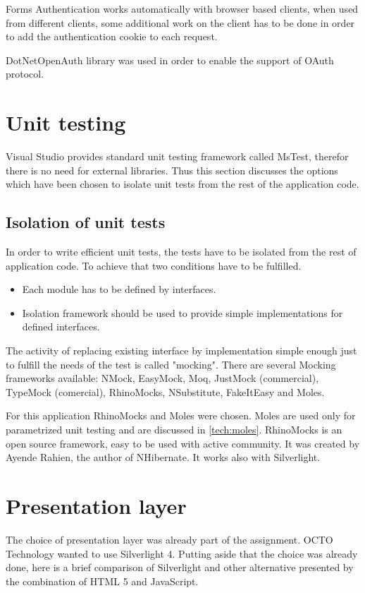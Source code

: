 Forms Authentication works automatically with browser based clients, when used from different clients, some additional work on the client has to be done in order to add the authentication cookie to each request.
 
DotNetOpenAuth library was used in order to enable the support of OAuth protocol.

\section{Unit testing}
\label{tech:unit}
Visual Studio provides standard unit testing framework called MsTest, therefor there is no need for external libraries. Thus this section discusses the options which have been chosen to isolate unit tests from the rest of the application code.

\subsection{Isolation of unit tests}
\label{tech:isolation}
In order to write efficient unit tests, the tests have to be isolated from the rest of application code. To achieve that two conditions have to be fulfilled.
\begin{itemize}
	\item  Each module has to be defined by interfaces.
	\item  Isolation framework should be used to provide simple implementations for defined interfaces.
\end{itemize}

The activity of replacing existing interface by implementation simple enough just to fulfill the needs of the test is called "mocking". There are several Mocking frameworks available: NMock, EasyMock, Moq, JustMock (commercial), TypeMock (comercial), RhinoMocks, NSubstitute, FakeItEasy and Moles.

For this application RhinoMocks and Moles were chosen. Moles are used only for parametrized unit testing and are discussed in \ref{tech:moles}.
RhinoMocks is an open source framework, easy to be used with active community. It was created by Ayende Rahien, the author of NHibernate. It works also with Silverlight.

\section{Presentation layer}
The choice of presentation layer was already part of the assignment. OCTO Technology wanted to use Silverlight 4. Putting aside that the choice was already done, here is a brief comparison of Silverlight and other alternative presented by the combination of HTML 5 and JavaScript.

